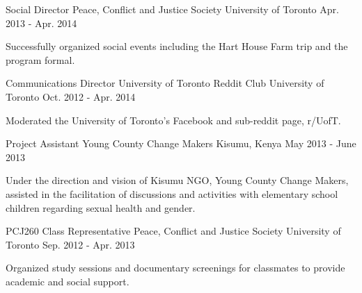 \begin{cventries}

  \cventry
    {Social Director} %
    {Peace, Conflict and Justice Society} %
    {University of Toronto} %
    {Apr. 2013 - Apr. 2014} %
    {
      \begin{cvitems} %
        \item {Successfully organized social events including the Hart House Farm trip and the program formal.}
      \end{cvitems}
    }
    
  \cventry
    {Communications Director} %
    {University of Toronto Reddit Club} %
    {University of Toronto} %
    {Oct. 2012 - Apr. 2014} %
    {
      \begin{cvitems} %
        \item {Moderated the University of Toronto’s Facebook and sub-reddit page, r/UofT.}
      \end{cvitems}
    }   
    
  \cventry
    {Project Assistant} %
    {Young County Change Makers} %
    {Kisumu, Kenya} %
    {May 2013 - June 2013} %
    {
      \begin{cvitems} %
        \item {Under the direction and vision of Kisumu NGO, Young County Change Makers, assisted in the facilitation of discussions and activities with elementary school children regarding sexual health and gender.}
      \end{cvitems}
    }     
    
  \cventry
    {PCJ260 Class Representative} %
    {Peace, Conflict and Justice Society} %
    {University of Toronto} %
    {Sep. 2012 - Apr. 2013} %
    {
      \begin{cvitems} %
        \item {Organized study sessions and documentary screenings for classmates to provide academic and social support.}
      \end{cvitems}
    }  
    

\end{cventries}
